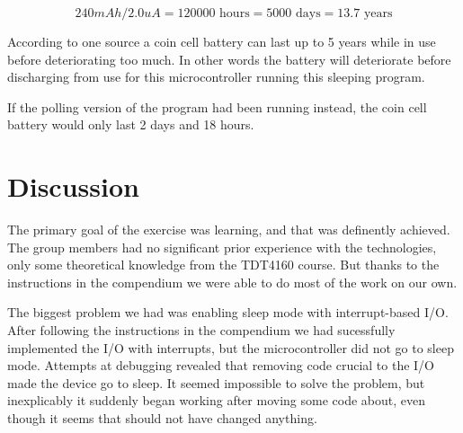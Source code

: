 \[
	240 mAh / 2.0 uA = 120 000 \text{~hours} = 5000 \text{~days} = 13.7 \text{~years}
\]

According to one source \cite{cr2032} a coin cell battery can last up to 5 years while in use before deteriorating too much. In other words the battery will deteriorate before discharging from use for this microcontroller running this sleeping program.

If the polling version of the program had been running instead, the coin cell battery would only last 2 days and 18 hours.

\section{Discussion}
The primary goal of the exercise was learning, and that was definently achieved. The group members had no significant prior experience with the technologies, only some theoretical knowledge from the TDT4160 course. But thanks to the instructions in the compendium we were able to do most of the work on our own.

The biggest problem we had was enabling sleep mode with interrupt-based I/O. After following the instructions in the compendium we had sucessfully implemented the I/O with interrupts, but the microcontroller did not go to sleep mode. Attempts at debugging revealed that removing code crucial to the I/O made the device go to sleep. It seemed impossible to solve the problem, but inexplicably it suddenly began working after moving some code about, even though it seems that should not have changed anything.
